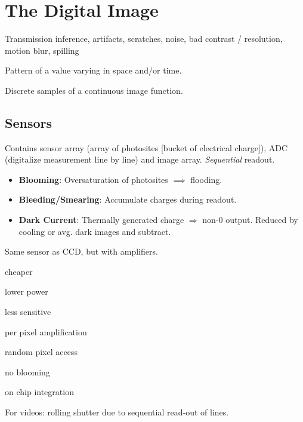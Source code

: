 \section{The Digital Image}

\begin{definition}[Problems]
   Transmission inference, artifacts, scratches, noise, bad contrast / resolution, motion blur, spilling
\end{definition}

\begin{definition}[Image]
  Pattern of a value varying in space and/or time.
\end{definition}

\begin{definition}[Pixel]
  Discrete samples of a continuous image function.
\end{definition}

\subsection{Sensors}
\begin{definition}
  Contains sensor array (array of photosites [bucket of electrical charge]), ADC (digitalize measurement line by line) and image array. \textit{Sequential} readout.
  \begin{itemize}[label=-]
    \item \textbf{Blooming}: Oversaturation of photosites \(\implies\) flooding.
    \item \textbf{Bleeding/Smearing}: Accumulate charges during readout.
    \item \textbf{Dark Current}: Thermally generated charge \(\Rightarrow\) non-0 output. Reduced by cooling or avg. dark images and subtract.
  \end{itemize}
\end{definition}

\begin{definition}[CMOS]
  Same sensor as CCD, but with amplifiers.
  \begin{itemize*}
    \item cheaper
    \item lower power
    \item less sensitive
    \item per pixel amplification
    \item random pixel access
    \item no blooming
    \item on chip integration
  \end{itemize*}

  For videos: rolling shutter due to sequential read-out of lines.
\end{definition}

